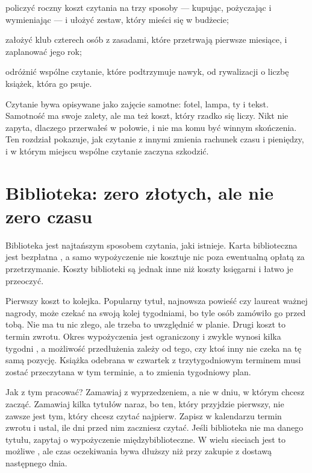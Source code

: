 
\begin{cele}
\item policzyć roczny koszt czytania na trzy sposoby --- kupując, pożyczając i wymieniając --- i ułożyć zestaw, który mieści się w budżecie;
\item założyć klub czterech osób z zasadami, które przetrwają pierwsze miesiące, i zaplanować jego rok;
\item odróżnić wspólne czytanie, które podtrzymuje nawyk, od rywalizacji o liczbę książek, która go psuje.
\end{cele}

Czytanie bywa opisywane jako zajęcie samotne: fotel, lampa, ty i tekst. Samotność ma swoje zalety, ale ma też koszt, który rzadko się liczy. Nikt nie zapyta, dlaczego przerwałeś w połowie, i nie ma komu być winnym skończenia. Ten rozdział pokazuje, jak czytanie z innymi zmienia rachunek czasu i pieniędzy, i w którym miejscu wspólne czytanie zaczyna szkodzić.

\section{Biblioteka: zero złotych, ale nie zero czasu}

Biblioteka jest najtańszym sposobem czytania, jaki istnieje. Karta biblioteczna jest bezpłatna , a samo wypożyczenie nie kosztuje nic poza ewentualną opłatą za przetrzymanie. Koszty biblioteki są jednak inne niż koszty księgarni i łatwo je przeoczyć.

Pierwszy koszt to kolejka. Popularny tytuł, najnowsza powieść czy laureat ważnej nagrody, może czekać na swoją kolej tygodniami, bo tyle osób zamówiło go przed tobą. Nie ma tu nic złego, ale trzeba to uwzględnić w planie. Drugi koszt to termin zwrotu. Okres wypożyczenia jest ograniczony i zwykle wynosi kilka tygodni , a możliwość przedłużenia zależy od tego, czy ktoś inny nie czeka na tę samą pozycję. Książka odebrana w czwartek z trzytygodniowym terminem musi zostać przeczytana w tym terminie, a to zmienia tygodniowy plan.

Jak z tym pracować? Zamawiaj z wyprzedzeniem, a nie w dniu, w którym chcesz zacząć. Zamawiaj kilka tytułów naraz, bo ten, który przyjdzie pierwszy, nie zawsze jest tym, który chcesz czytać najpierw. Zapisz w kalendarzu termin zwrotu i ustal, ile dni przed nim zaczniesz czytać. Jeśli biblioteka nie ma danego tytułu, zapytaj o wypożyczenie międzybiblioteczne. W wielu sieciach jest to możliwe , ale czas oczekiwania bywa dłuższy niż przy zakupie z dostawą następnego dnia.

